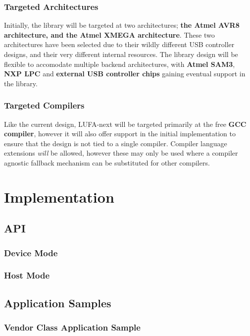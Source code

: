 \documentclass[a4paper,oneside,notitlepage]{book}
\begin{document}
\subsection{Targeted Architectures}
Initially, the library will be targeted at two architectures; \textbf{the Atmel AVR8 architecture, and the Atmel XMEGA architecture}. These two architectures have been selected due to their wildly different USB controller designs, and their very different internal resources. The library design will be flexible to accomodate multiple backend architectures, with \textbf{Atmel SAM3}, \textbf{NXP LPC} and \textbf{external USB controller chips} gaining eventual support in the library.

\subsection{Targeted Compilers}
Like the current design, LUFA-next will be targeted primarily at the free \textbf{GCC compiler}, however it will also offer  support in the initial implementation to ensure that the design is not tied to a single compiler. Compiler language extensions \textit{will} be allowed, however these may only be used where a compiler agnostic fallback mechanism can be substituted for other compilers.

\label{chp:Implementation}
\chapter{Implementation}

\section{API}

\subsection{Device Mode}

\subsection{Host Mode}

\section{Application Samples}

\subsection{Vendor Class Application Sample}
\end{document}
